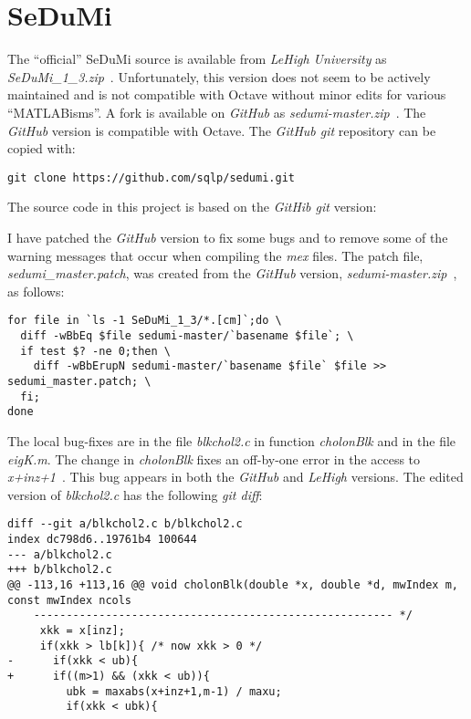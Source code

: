 \documentclass[a4paper,twoside,10pt,english]{report}
\begin{document}
\section*{SeDuMi}
The ``official'' SeDuMi source is available from \emph{LeHigh
University} as \emph{SeDuMi\_1\_3.zip}~\cite{Sturm_SeDuMi_1_3}. Unfortunately,
this version does not seem to be actively maintained and is not compatible 
with Octave without minor edits for various ``MATLABisms''. A fork is available
on \emph{GitHub} as \emph{sedumi-master.zip}~\cite{Sturm_SeDuMi_GitHub}.
The \emph{GitHub} version is compatible with Octave. The \emph{GitHub git} 
repository can be copied with:
\begin{small}
\begin{verbatim}
git clone https://github.com/sqlp/sedumi.git
\end{verbatim}
\end{small}
The source code in this project is based on the \emph{GitHib git} version:
\begin{small}

\end{small}
I have patched the \emph{GitHub} version to fix some bugs and to remove some 
of the warning messages that occur when compiling the \emph{mex} files. The 
patch file, \emph{sedumi\_master.patch}, was created from the \emph{GitHub} 
version, \emph{sedumi-master.zip}~\cite{Sturm_SeDuMi_GitHub}, as follows:
\begin{small}
\begin{verbatim}
for file in `ls -1 SeDuMi_1_3/*.[cm]`;do \
  diff -wBbEq $file sedumi-master/`basename $file`; \
  if test $? -ne 0;then \
    diff -wBbErupN sedumi-master/`basename $file` $file >> sedumi_master.patch; \
  fi;
done 
\end{verbatim}
\end{small}

The local bug-fixes are in the file \emph{blkchol2.c} in function 
\emph{cholonBlk} and in the file \emph{eigK.m}. The change in \emph{cholonBlk} 
fixes an off-by-one error in the access to 
\emph{x+inz+1}~\cite{SeDuMi_BugReport}. This bug appears in both the 
\emph{GitHub} and \emph{LeHigh} versions. The edited version of 
\emph{blkchol2.c} has the following \emph{git diff}:
\begin{small}
\begin{verbatim}
diff --git a/blkchol2.c b/blkchol2.c
index dc798d6..19761b4 100644
--- a/blkchol2.c
+++ b/blkchol2.c
@@ -113,16 +113,16 @@ void cholonBlk(double *x, double *d, mwIndex m, const mwIndex ncols
    ------------------------------------------------------- */
     xkk = x[inz];
     if(xkk > lb[k]){ /* now xkk > 0 */
-      if(xkk < ub){
+      if((m>1) && (xkk < ub)){
         ubk = maxabs(x+inz+1,m-1) / maxu;
         if(xkk < ubk){
\end{verbatim}
\end{small}
\end{document}
